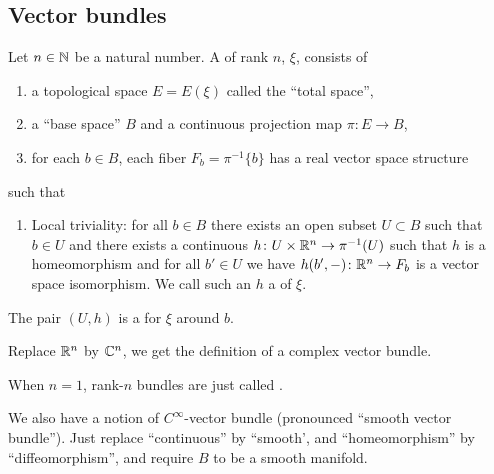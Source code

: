 
\lecture{}


\subsection{Vector bundles}

\begin{definition}
Let $n\in\mathbb{N}$ be a natural number.
A  of rank $n$, $\xi$, consists of
\begin{enumerate}
\item a topological space $E=E(\xi)$ called the ``total space'',
\item a ``base space'' $B$ and a continuous projection map $\pi\colon E\to B$,
\item for each $b\in B$, each fiber $F_{b}=\pi^{-1}\{b\}$ has a real
  vector space structure
\end{enumerate}
such that
\begin{enumerate}
\item Local triviality: for all $b\in B$ there exists an open subset
  $U\subset B$ such that $b\in U$ and there exists a continuous
  $h\colon U\times\mathbb{R}^{n}\to\pi^{-1}(U)$ such that $h$ is a
  homeomorphism and for all $b'\in U$ we have $h(b',-)\colon\mathbb{R}^{n}\to F_{b}$
  is a vector space isomorphism. We call such an $h$ a 
  of $\xi$.
\end{enumerate}
The pair $(U,h)$ is a  for $\xi$
around $b$.
\end{definition}

\begin{remark}
Replace $\mathbb{R}^{n}$ by $\mathbb{C}^{n}$, we get the definition of a complex
vector bundle.
\end{remark}

\begin{remark}
When $n=1$, rank-$n$ bundles are just called .
\end{remark}

\begin{node}
We also have a notion of $C^{\infty}$-vector bundle (pronounced
``smooth vector bundle''). Just replace ``continuous'' by ``smooth',
and ``homeomorphism'' by ``diffeomorphism'', and require $B$ to be a
smooth manifold.
\end{node}

